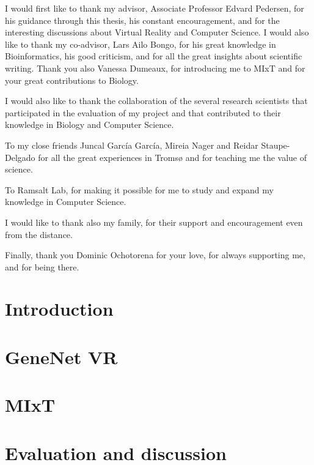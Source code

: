 \documentclass[print]{uit-thesis}
\begin{document}
\begin{acknowledgement}

I would first like to thank my advisor, Associate Professor Edvard Pedersen, for his guidance through this thesis, his constant encouragement, and for the interesting discussions about Virtual Reality and Computer Science. I would also like to thank my co-advisor, Lars Ailo Bongo, for his great knowledge in Bioinformatics, his good criticism, and for all the great insights about scientific writing. Thank you also Vanessa Dumeaux, for introducing me to MIxT and for your great contributions to Biology.

I would also like to thank the collaboration of the several research scientists that participated in the evaluation of my project and that contributed to their knowledge in Biology and Computer Science.

To my close friends Juncal García García, Mireia Nager and Reidar Staupe-Delgado for all the great experiences in Tromsø and for teaching me the value of science.

To Ramsalt Lab, for making it possible for me to study and expand my knowledge in Computer Science.

I would like to thank also my family, for their support and encouragement even from the distance.

Finally, thank you Dominic Ochotorena for your love, for always supporting me, and for being there.

\end{acknowledgement}

\tableofcontents

\mainmatter

\chapter{Introduction}


\chapter{GeneNet VR}


\chapter{MIxT}


\chapter{Evaluation and discussion}

\end{document}
